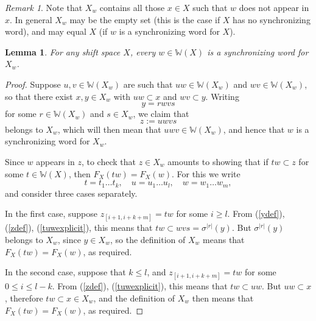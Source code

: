 \documentclass[reqno,11pt]{amsart}
\newtheorem{lem}[thm]{Lemma}
\theoremstyle{definition}
\theoremstyle{remark}
\theoremstyle{remark}
\newtheorem{rem}[thm]{Remark}
\def\w{\mathbb{W}}
\numberwithin{equation}{section}
\begin{document}
\begin{rem}\label{xwremark}
Note that 
$X_w$ contains all those $x\in X$ such that $w$ does not appear in $x$.
In general $X_w$ may be the empty set (this is the case if $X$ has no synchronizing word),
and may equal $X$ (if $w$ is a synchronizing word for $X$).
\end{rem}


\begin{lem}\label{xwiswsynchronizing}
For any shift space $X$,
every $w\in \w(X)$
is a synchronizing word for $X_w$.
\end{lem}
\begin{proof}
Suppose $u,v\in\w(X_w)$ are such that $uw\in\w(X_w)$ and $wv\in\w(X_w)$, so that there exist $x,y\in X_w$ with $uw\subset x$ and $wv\subset y$.
Writing 
\begin{equation}\label{ydef}
y=rwvs
\end{equation}
 for some $r\in\w(X_w)$ and $s\in X_w$, we claim that
\begin{equation}\label{zdef}
z:=uwvs
\end{equation}
belongs to $X_w$, which will then mean that $uwv\in \w(X_w)$, and hence that $w$ is a synchronizing word for $X_w$.

Since $w$ appears in $z$, to check that $z\in X_w$ amounts to showing that if $tw\subset z$ for some $t\in \w(X)$, then
$F_X(tw)=F_X(w)$.
For this we write 
\begin{equation}\label{tuwexplicit}
t=t_1\ldots t_k, \quad u=u_1\ldots u_l , \quad w=w_1\ldots w_m,
\end{equation} 
and consider three cases separately.

In the first case, suppose $z_{[i+1,i+k+m]}=tw$ for some $i\ge l$. From (\ref{ydef}), (\ref{zdef}), (\ref{tuwexplicit}), this means that
$tw\subset wvs=\sigma^{|r|}(y)$.
But $\sigma^{|r|}(y)$ belongs to $X_w$, since $y\in X_w$,
so the definition of $X_w$ means that
$F_X(tw)=F_X(w)$, as required.

In the second case, suppose that $k\le l$, and  $z_{[i+1,i+k+m]}=tw$ for some $0\le i\le l-k$.
From (\ref{zdef}), (\ref{tuwexplicit}), this means that
$tw\subset uw$.
But $uw\subset x$, therefore $tw\subset x\in X_w$, and the definition of $X_w$ then means that
 $F_X(tw)=F_X(w)$, as required.


\end{proof}
\end{document}
